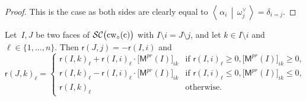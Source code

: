 \documentclass[ALCO,Unicode,ThmDefs]{cedram}
\newcommand{\Mpr}{\sfM^{pr}}
\newcommand{\subwordComplex}{\mathcal{SC}}
\newcommand{\clusterComplex}{\subwordComplex\big(\cw{c}\big)}
\newcommand{\sq}[1]{{\rm #1}}
\newcommand{\sfr}{\mathsf{r}}
\newcommand{\wo}{{w_\circ}}
\newcommand{\sw}[2]{\sq{#1}(\sq{#2})}
\newcommand{\cwo}[1]{\sw{\wo}{#1}}
\newcommand{\cw}[1]{\sq{#1}\cwo{#1}}
\newcommand{\Root}[2]{{\sfr}(#1,#2)}
\newcommand{\dotprod}[2]{\left\langle \, #1 \,\middle|\, #2 \, \right\rangle}
\newcommand{\sfM}{\mathsf{M}}
\begin{document}
\begin{proof}
This is the case as both sides are clearly equal to $\dotprod{\alpha_i}{\omega_j^\vee} = \delta_{i=j}$.
\end{proof}

\begin{prop}\label{prop:exchangeRelationslemma}
Let~$I,J$ be two faces of $\clusterComplex$ with $I\setminus i = J\setminus j$, and let $k \in I\setminus i$ and $\ell \in \{1,\dots,n\}$. Then $\Root{J}{j} = -\Root{I}{i}$ and
\[
\Root{J}{k}_\ell =
\begin{cases}
\Root{I}{k}_\ell + \Root{I}{i}_\ell \cdot \big[\Mpr(I)\big]_{ik} & \mbox{if } \Root{I}{i}_\ell \geq 0, \big[\Mpr(I)\big]_{ik}\geq 0, \\[5pt]
\Root{I}{k}_\ell - \Root{I}{i}_\ell \cdot \big[\Mpr(I)\big]_{ik} & \mbox{if } \Root{I}{i}_\ell \leq 0, \big[\Mpr(I)\big]_{ik}\leq 0, \\[5pt]
\Root{I}{k}_\ell & \mbox{otherwise}.
\end{cases}
\]
\end{prop}
\end{document}
